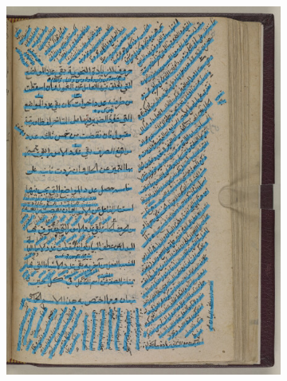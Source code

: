 \begin{figure}[]
	\begin{subfigure}[b]{.475\columnwidth}
		\centering
		\includegraphics[height=0.4\textheight]{curved.jpg}
	\end{subfigure}
	\hfill
	\begin{subfigure}[b]{.475\columnwidth}
		\centering

\end{subfigure}
\end{figure}
